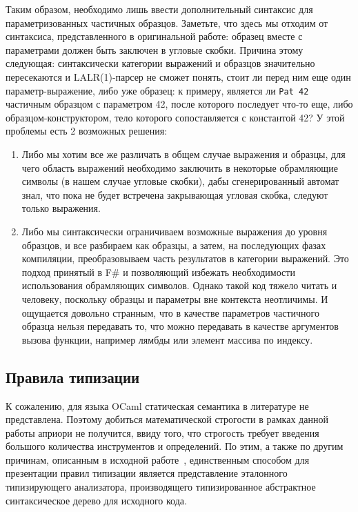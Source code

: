 Таким образом, необходимо лишь ввести дополнительный синтаксис для параметризованных частичных образцов. Заметьте, что здесь мы отходим от синтаксиса, представленного в оригинальной работе: образец вместе с параметрами должен быть заключен в угловые скобки. Причина этому следующая: синтаксически категории выражений и образцов значительно пересекаются и LALR(1)-парсер не сможет понять, стоит ли перед ним еще один параметр-выражение, либо уже образец: к примеру, является ли \lstinline|Pat 42| частичным образцом с параметром 42, после которого последует что-то еще, либо образцом-конструктором, тело которого сопоставляется с константой 42? У этой проблемы есть 2 возможных решения:

\begin{enumerate}
\item Либо мы хотим все же различать в общем случае выражения и образцы, для чего область выражений необходимо заключить в некоторые обрамляющие символы (в нашем случае угловые скобки), дабы сгенерированный автомат знал, что пока не будет встречена закрывающая угловая скобка, следуют только выражения.
\item Либо мы синтаксически ограничиваем возможные выражения до уровня образцов, и все разбираем как образцы, а затем, на последующих фазах компиляции, преобразовываем часть результатов в категории выражений. Это подход принятый в F\# и позволяющий избежать необходимости использования обрамляющих символов. Однако такой код тяжело читать и человеку, поскольку образцы и параметры вне контекста неотличимы. И ощущается довольно странным, что в качестве параметров частичного образца нельзя передавать то, что можно передавать в качестве аргументов вызова функции, например лямбды или элемент массива по индексу.
\end{enumerate}

\subsection{Правила типизации}

К сожалению, для языка OCaml статическая семантика в литературе не представлена. Поэтому добиться математической строгости в рамках данной работы априори не получится, ввиду того, что строгость требует введения большого количества инструментов и определений. По этим, а также по другим причинам, описанным в исходной работе~\cite{syme2007extensible}, единственным способом для презентации правил типизации является представление эталонного типизирующего анализатора, производящего типизированное абстрактное синтаксическое дерево для исходного кода. 

